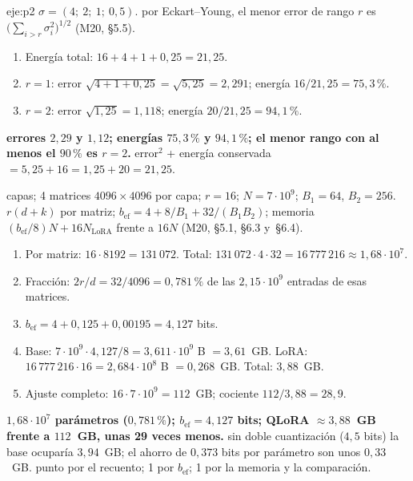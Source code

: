 \begin{solucion}{eje:p2}
\datos $\sigma=(4;\ 2;\ 1;\ 0{,}5)$.
\planteamiento por Eckart--Young, el menor error de rango $r$ es $\bigl(\sum_{i>r}\sigma_i^{2}\bigr)^{1/2}$ (M20, §5.5).
\pasos
\begin{enumerate}[label=\arabic*.]
  \item Energía total: $16+4+1+0{,}25=21{,}25$.
  \item $r=1$: error $\sqrt{4+1+0{,}25}=\sqrt{5{,}25}=2{,}291$; energía $16/21{,}25=75{,}3\,\%$.
  \item $r=2$: error $\sqrt{1{,}25}=1{,}118$; energía $20/21{,}25=94{,}1\,\%$.
\end{enumerate}
\resultado \textbf{errores $2{,}29$ y $1{,}12$; energías $75{,}3\,\%$ y $94{,}1\,\%$; el menor rango con al menos el $90\,\%$ es $r=2$.}
\comprobacion error$^{2}$ + energía conservada $=5{,}25+16=1{,}25+20=21{,}25$.

 capas; 4 matrices $4096\times 4096$ por capa; $r=16$; $N=7\cdot 10^{9}$; $B_1=64$, $B_2=256$.
\planteamiento $r(d+k)$ por matriz; $b_{\mathrm{ef}}=4+8/B_1+32/(B_1B_2)$; memoria $(b_{\mathrm{ef}}/8)N+16N_{\mathrm{LoRA}}$ frente a $16N$ (M20, §5.1, §6.3 y~§6.4).
\pasos
\begin{enumerate}[label=\arabic*.]
  \item Por matriz: $16\cdot 8192=131\,072$. Total: $131\,072\cdot 4\cdot 32=16\,777\,216\approx 1{,}68\cdot 10^{7}$.
  \item Fracción: $2r/d=32/4096=0{,}781\,\%$ de las $2{,}15\cdot 10^{9}$ entradas de esas matrices.
  \item $b_{\mathrm{ef}}=4+0{,}125+0{,}00195=4{,}127$ bits.
  \item Base: $7\cdot 10^{9}\cdot 4{,}127/8=3{,}611\cdot 10^{9}$ B $=3{,}61$~GB. LoRA: $16\,777\,216\cdot 16=2{,}684\cdot 10^{8}$ B $=0{,}268$~GB. Total: $3{,}88$~GB.
  \item Ajuste completo: $16\cdot 7\cdot 10^{9}=112$~GB; cociente $112/3{,}88=28{,}9$.
\end{enumerate}
\resultado \textbf{$1{,}68\cdot 10^{7}$ parámetros ($0{,}781\,\%$); $b_{\mathrm{ef}}=4{,}127$ bits; QLoRA $\approx 3{,}88$~GB frente a $112$~GB, unas 29 veces menos.}
\comprobacion sin doble cuantización ($4{,}5$ bits) la base ocuparía $3{,}94$~GB; el ahorro de $0{,}373$ bits por parámetro son unos $0{,}33$~GB.
 punto por el recuento; 1 por $b_{\mathrm{ef}}$; 1 por la memoria y la comparación.


\end{solucion}
